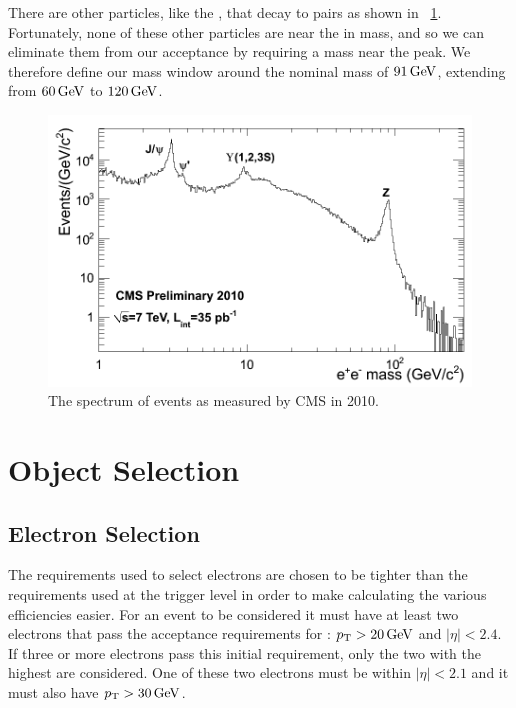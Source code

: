 There are other particles, like the \jpsi, that decay to \ee pairs as shown in
\FIG~\ref{fig:ee_spectrum}. Fortunately, none of these other particles are near
the \Z in mass, and so we can eliminate them from our acceptance by requiring a
mass near the \Z peak. We therefore define our mass window around the nominal
\Z mass of $91 \,\text{Ge\hspace{-.08em}V}$, extending from $60 \,\text{Ge\hspace{-.08em}V}$ to $120 \,\text{Ge\hspace{-.08em}V}$.

\begin{figure}[!htbp]
    \centering
    \includegraphics[width=\textwidth]{figures/dielectron_mass_7tev.png}
    \caption{
        The spectrum of \ee events as measured by CMS in 2010.
    }
    \label{fig:ee_spectrum}
\end{figure}

\section{Object Selection}

\subsection{Electron Selection}
\label{ssec:electron_selection}

The requirements used to select electrons are chosen to be tighter than the
requirements used at the trigger level in order to make calculating the various
efficiencies easier. For an event to be considered it must have at least two
electrons that pass the acceptance requirements for \ExtendedElectrons: $p_{\mathrm{T}} >
20 \,\text{Ge\hspace{-.08em}V}$ and $|\eta| < 2.4$. If three or more electrons pass this initial
requirement, only the two with the highest \pt are considered. One of these two
electrons must be within $|\eta| < 2.1$ and it must also have $p_{\mathrm{T}} > 30 \,\text{Ge\hspace{-.08em}V}$.

